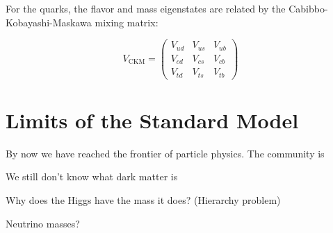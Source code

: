 For the quarks, the flavor and mass eigenstates are related by the Cabibbo-Kobayashi-Maskawa mixing matrix:

\begin{equation}
  V_\text{CKM} =
  \begin{pmatrix}
    V_{ud} & V_{us} & V_{ub}\\
    V_{cd} & V_{cs} & V_{cb}\\
    V_{td} & V_{ts} & V_{tb}
  \end{pmatrix}
\end{equation}

\section{Limits of the Standard Model}
By now we have reached the frontier of particle physics. The community is 

We still don't know what dark matter is

Why does the Higgs have the mass it does? (Hierarchy problem)

Neutrino masses?
